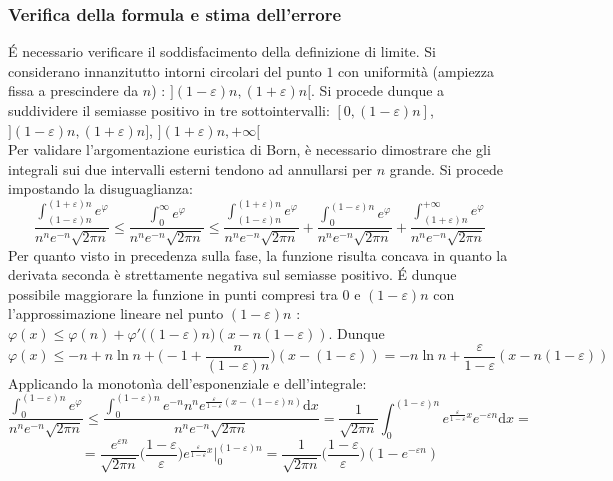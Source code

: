 \documentclass[10pt]{article}
\theoremstyle{plain}
\begin{document}
\subsubsection{Verifica della formula e stima dell'errore}
\'E necessario verificare il soddisfacimento della definizione di limite. Si considerano innanzitutto intorni circolari del punto $1$ con uniformità (ampiezza fissa a prescindere da $n$) : $](1-\varepsilon)n , (1+\varepsilon) n[$. Si procede dunque a suddividere il semiasse positivo in tre sottointervalli: $[0, (1-\varepsilon)n]$, $](1-\varepsilon)n, (1+\varepsilon)n]$, $](1+\varepsilon)n, + \infty[$
\\Per validare l'argomentazione euristica di Born, è necessario dimostrare che gli integrali sui due intervalli esterni tendono ad annullarsi per $n$ grande. Si procede impostando la disuguaglianza:
\[\frac{\displaystyle \int_{(1 - \varepsilon) n}^{(1+\varepsilon)n} e^\varphi}{n^n e^{-n} \sqrt{2\pi n}} \leq \frac{\displaystyle \int_{0}^{\infty} e^\varphi}{n^n e^{-n} \sqrt{2\pi n}} \leq \frac{\displaystyle \int_{(1 - \varepsilon) n}^{(1+\varepsilon)n} e^\varphi}{n^n e^{-n} \sqrt{2\pi n}} + \frac{\displaystyle \int_{0}^{(1-\varepsilon)n} e^\varphi}{n^n e^{-n} \sqrt{2\pi n}} + \frac{\displaystyle \int_{(1 + \varepsilon) n}^{+\infty} e^\varphi}{n^n e^{-n} \sqrt{2\pi n}}\]
Per quanto visto in precedenza sulla fase, la funzione risulta concava in quanto la derivata seconda è strettamente negativa sul semiasse positivo. \'E dunque possibile maggiorare la funzione in punti compresi tra $0$ e $(1-\varepsilon) n$ con l'approssimazione lineare nel punto $(1 - \varepsilon ) n$ : $\displaystyle \varphi(x) \leq \varphi(n) + \varphi'\big((1 - \varepsilon) n\big) (x - n(1 - \varepsilon))$. Dunque
\[\varphi(x) \leq -n + n\ln n + \bigg(- 1 + \frac{n}{(1 - \varepsilon) n}\bigg) (x - (1 - \varepsilon) ) = - n\ln n + \frac{\varepsilon}{1 - \varepsilon}(x - n (1 - \varepsilon))\]
Applicando la monotonìa dell'esponenziale e dell'integrale:
\[\frac{\displaystyle \int_{0}^{(1-\varepsilon)n} e^\varphi}{n^n e^{-n} \sqrt{2\pi n}} \leq \frac{\displaystyle \int_{0}^{(1-\varepsilon)n} e^{-n} n^n e^{\displaystyle \frac{\varepsilon}{1 - \varepsilon}(x - (1 - \varepsilon) n)} \textrm{d}x}{n^n e^{-n} \sqrt{2\pi n}} = \frac{1}{\sqrt{2\pi n}}\int_{0}^{(1-\varepsilon)n} e^{\displaystyle \frac{\varepsilon}{1 - \varepsilon}x} e^{-\varepsilon n} \textrm{d}x =\] \[=\frac{e^{\varepsilon n}}{\sqrt{2 \pi n}} \big(\frac{1 - \varepsilon}{\varepsilon}\big) e^{\displaystyle \frac{\varepsilon}{1 - \varepsilon} x} \bigg|_0^{(1 - \varepsilon) n} = \frac{1}{\sqrt{2 \pi n}} \big(\frac{1 - \varepsilon}{\varepsilon}\big) (1 - e^{-\varepsilon n})\]
\end{document}
